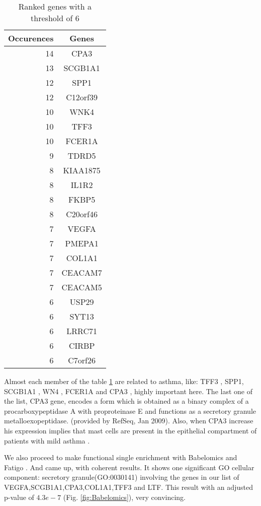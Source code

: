 \documentclass[conference,a4paper]{IEEEtran}
\begin{document}
\begin{table}[h]
	\caption{Ranked genes with a threshold of 6}
	\centering
	\begin{tabular}{r c}
		\hline\hline
		Occurences & Genes\\ [0.2ex]
		\hline
		14 & CPA3 \\
		13 & SCGB1A1 \\
		12 & SPP1 \\
		12 & C12orf39 \\
		10 & WNK4 \\
		10 & TFF3 \\
		10 & FCER1A \\
		9 & TDRD5 \\
		8 & KIAA1875 \\
		8 & IL1R2 \\
		8 & FKBP5 \\
		8 & C20orf46 \\
		7 & VEGFA \\
		7 & PMEPA1 \\
		7 & COL1A1 \\
		7 & CEACAM7 \\
		7 & CEACAM5 \\
		6 & USP29 \\
		6 & SYT13 \\
		6 & LRRC71 \\
		6 & CIRBP \\
		6 & C7orf26 \\[1ex]
		\hline
	\end{tabular}
	\label{table:Genes-Occurrences}
\end{table}

Almost each member of the table \ref{table:Genes-Occurrences} are related to asthma, like: TFF3 \cite{TFFs}, SPP1\cite{SPP1}, SCGB1A1 \cite{SCGB1A1}, WN4 \cite{WN4}, FCER1A \cite{FCER1A} and CPA3 \cite{CPA3asthma}, highly important here. The last one of the list, CPA3 gene, encodes a form which is obtained as a binary complex of a procarboxypeptidase A with proproteinase E and functions as a secretory granule metalloexopeptidase. (provided by RefSeq, Jan 2009). Also, when CPA3 increase his expression implies that mast cells are present in the epithelial compartment of patients with mild asthma \cite{MCcells}.

We also proceed to make functional single enrichment with Babelomics and Fatigo \cite{Babelomics}. And came up, with coherent results. It shows one significant GO cellular component: secretory granule(GO:0030141) involving the genes in our list of VEGFA,SCGB1A1,CPA3,COL1A1,TFF3 and LTF. This result with an adjusted p-value of $4.3e-7$ (Fig. \ref{fig:Babelomics}), very convincing.
\end{document}
